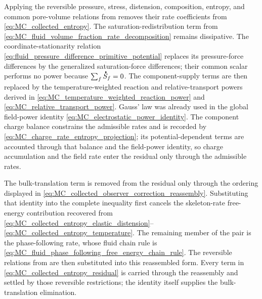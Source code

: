 Applying the reversible pressure, stress, distension, composition, entropy,
and common pore-volume relations from
 removes their rate coefficients from
\eqref{eq:MC_collected_entropy}.  The saturation-redistribution term from
\eqref{eq:MC_fluid_volume_fraction_rate_decomposition} remains dissipative.
The coordinate-stationarity relation
\eqref{eq:fluid_pressure_difference_primitive_potential} replaces its
pressure-force differences by the generalized saturation-force differences;
their common scalar performs no power because \(\sum_f\phasedot S_f=0\).
The component-supply terms
are then replaced by the temperature-weighted reaction and relative-transport
powers derived in \eqref{eq:MC_temperature_weighted_reaction_power} and
\eqref{eq:MC_relative_transport_power}.  Gauss' law was already used in the
global field-power identity \eqref{eq:MC_electrostatic_power_identity}.  The
component charge balance constrains the admissible rates and is recorded by
\eqref{eq:MC_charge_rate_entropy_projection}; its potential-dependent terms
are accounted through that balance and the field-power identity, so charge
accumulation and the field rate enter the residual only through the admissible
rates.

The bulk-translation term is removed from the residual only through the
ordering displayed in
\eqref{eq:MC_collected_observer_correction_reassembly}.  Substituting that
identity into the complete inequality first cancels the skeleton-rate
free-energy contribution recovered from
\eqref{eq:MC_collected_entropy_elastic_distension}--%
\eqref{eq:MC_collected_entropy_temperature}.  The remaining member of the pair
is the phase-following rate, whose fluid chain rule is
\eqref{eq:MC_fluid_phase_following_free_energy_chain_rule}.  The reversible
relations from  are then substituted into this
reassembled form.  Every term in
\eqref{eq:MC_collected_entropy_residual} is carried through the reassembly and
settled by those reversible restrictions; the identity itself supplies the
bulk-translation elimination.

